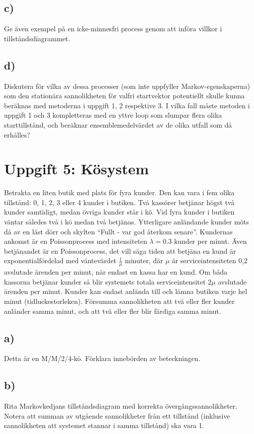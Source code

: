 \documentclass[a4paper]{article}
\begin{document}
\subsection{c)}
Ge även exempel på en icke-minnesfri process genom att införa villkor i tillståndsdiagrammet.

\subsection{d)}
Diskutera för vilka av dessa processer (som inte uppfyller Markov-egenskaperna) som den
stationära sannolikheten för valfri startvektor potentiellt skulle kunna beräknas med
metoderna i uppgift 1, 2 respektive 3. I vilka fall måste metoden i uppgift 1 och 3 kompletteras
med en yttre loop som slumpar flera olika starttillstånd, och beräknar ensemblemedelvärdet
av de olika utfall som då erhålles?

\newpage
\section{Uppgift 5: Kösystem}
Betrakta en liten butik med plats för fyra kunder. Den kan vara i fem olika tillstånd: 0, 1, 2, 3
eller 4 kunder i butiken. Två kassörer betjänar högst två kunder samtidigt, medan övriga
kunder står i kö. Vid fyra kunder i butiken väntar således två i kö medan två betjänas.
Ytterligare anländande kunder möts då av en låst dörr och skylten ``Fullt - var god återkom
senare''. Kundernas ankomst är en Poissonprocess med intensiteten \( \lambda =0.3\) kunder per minut.
Även betjänandet är en Poissonprocess, det vill säga tiden att betjäna en kund är
exponentialfördelad med väntevärdet \( \frac{1}{\mu} \) minuter, där \( \mu \) är serviceintensiteten 0,2 avslutade
ärenden per minut, när endast en kassa har en kund. Om båda kassorna betjänar kunder så
blir systemets totala serviceintensitet \( 2\mu  \) avslutade ärenden per minut. Kunder kan endast
anlända till och lämna butiken varje hel minut (tidluckestorleken). Försumma sannolikheten
att två eller fler kunder anländer samma minut, och att två eller fler blir färdiga samma minut.

\subsection{a)}
Detta är en M/M/2/4-kö. Förklara innebörden av beteckningen.

\subsection{b)}
Rita Markovkedjans tillståndsdiagram med korrekta övergångssannolikheter. Notera
att summan av utgående sannolikheter från ett tillstånd (inklusive sannolikheten att
systemet stannar i samma tillstånd) ska vara 1.
\end{document}
